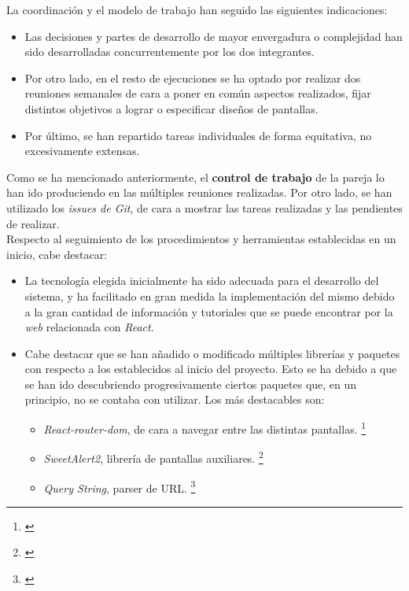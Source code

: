\documentclass[11pt, a4paper, titlepage]{article}
\begin{document}
La coordinación y el modelo de trabajo han seguido las siguientes indicaciones:

\begin{itemize}
    \item Las decisiones y partes de desarrollo de mayor envergadura o complejidad han sido desarrolladas concurrentemente por los dos integrantes.
    \item Por otro lado, en el resto de ejecuciones se ha optado por realizar dos reuniones semanales de cara a poner en común aspectos realizados, fijar distintos objetivos a lograr o especificar diseños de pantallas.
    \item Por último, se han repartido tareas individuales de forma equitativa, no excesivamente extensas.
\end{itemize}

Como se ha mencionado anteriormente, el \textbf{control de trabajo} de la pareja lo han ido produciendo en las múltiples reuniones realizadas. Por otro lado, se han utilizado los \textit{issues de Git}, de cara a mostrar las tareas realizadas y las pendientes de realizar. \\

Respecto al seguimiento de los procedimientos y herramientas establecidas en un inicio, cabe destacar:

\begin{itemize}
    \item La tecnología elegida inicialmente ha sido adecuada para el desarrollo del sistema, y ha facilitado en gran medida la implementación del mismo debido a la gran cantidad de información y tutoriales que se puede encontrar por la \textit{web} relacionada con \textit{React}.

    \item Cabe destacar que se han añadido o modificado múltiples librerías y paquetes con respecto a los establecidos al inicio del proyecto. Esto se ha debido a que se han ido descubriendo progresivamente ciertos paquetes que, en un principio, no se contaba con utilizar. Los más destacables son:
        \begin{itemize}
            \item \textit{React-router-dom}, de cara a navegar entre las distintas pantallas. \footnote{\href{https://v5.reactrouter.com/web/guides/quick-start}{}}
            \item \textit{SweetAlert2}, librería de pantallas auxiliares.
            \footnote{\href{https://sweetalert2.github.io}{}}
            \item \textit{Query String}, parser de URL.
            \footnote{\href{https://www.npmjs.com/package/query-string}{}}
        \end{itemize}
\end{itemize}
\end{document}
